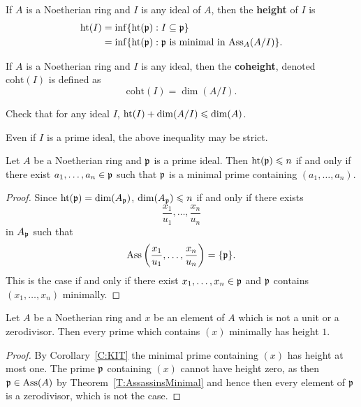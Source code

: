 \documentclass{ximera}
\begin{document}
\begin{definition}
  If $A$ is a Noetherian ring and $I$ is any ideal of $A$, then the \textbf{height} of $I$ is 
  \begin{align*}
    \operatorname{ht}(I) &= \inf\{\operatorname{ht}(\mathfrak{p}): I\subseteq\mathfrak{p}\} \\
    &= \inf\{\operatorname{ht}(\mathfrak{p}): \mathfrak{p} \text{ is minimal in $\operatorname{Ass}_A(A/I)$}\}.
  \end{align*}
\end{definition}

\begin{definition}
  If $A$ is a Noetherian ring and $I$ is any ideal, then the \textbf{coheight}, denoted $\mathrm{coht}(I)$ is defined as 
  \[
  \mathrm{coht}(I) = \dim(A/I).
  \]
\end{definition}

\begin{exercise}
  Check that for any ideal $I$, $\operatorname{ht}(I)+\dim(A/I)\leqslant\dim(A)$. 
\end{exercise}

\begin{warning}
  Even if $I$ is a prime ideal, the above inequality may be strict.
\end{warning}

\begin{corollary}\label{C:KIT}
  Let $A$ be a Noetherian ring and $\mathfrak{p}$ is a prime ideal.  Then
  $\operatorname{ht}(\mathfrak{p})\leqslant n$ if and only if there exist $a_1,\dots,a_n\in\mathfrak{p}$ such
  that $\mathfrak{p}$ is a minimal prime containing $(a_1,\dots,a_n)$.
  \begin{proof}
    Since $\operatorname{ht}(\mathfrak{p}) = \dim(A_{\mathfrak{p}})$, $\dim(A_{\mathfrak{p}})\leqslant n$ if and only if there exists 
    \[
    \frac{x_1}{u_1}, \dots, \frac{x_n}{u_n}
    \]
    in $A_{\mathfrak{p}}$ such that 
    \[
    \operatorname{Ass}\left(\frac{x_1}{u_1}, \dots, \frac{x_n}{u_n}\right) = \{\mathfrak{p}\}.
    \]
    This is the case if and only if there exist $x_1,\dots, x_n\in \mathfrak{p}$
    and $\mathfrak{p}$ contains $(x_1,\dots,x_n)$ minimally.
  \end{proof}
\end{corollary}


\begin{corollary}
  Let $A$ be a Noetherian ring and $x$ be an element of $A$ which is
  not a unit or a zerodivisor. Then every prime which contains $(x)$
  minimally has height $1$.
  \begin{proof}
    By Corollary~\ref{C:KIT} the minimal prime containing $(x)$ has
    height at most one. The prime $\mathfrak{p}$ containing $(x)$ cannot have
    height zero, as then $\mathfrak{p}\in\operatorname{Ass}(A)$ by
    Theorem~\ref{T:AssassinsMinimal} and hence then every element of
    $\mathfrak{p}$ is a zerodivisor, which is not the case.
  \end{proof}
\end{corollary}
\end{document}
